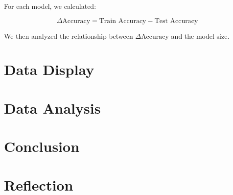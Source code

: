 \documentclass[12pt]{article}
\begin{document}
    For each model, we calculated:

    \[
        \Delta \text{Accuracy} = \text{Train Accuracy} - \text{Test Accuracy}
    \]

    We then analyzed the relationship between \( \Delta \text{Accuracy} \) and the model size.

    \section*{Data Display}


    \section*{Data Analysis}

    \section*{Conclusion}

    \section*{Reflection}
\end{document}
